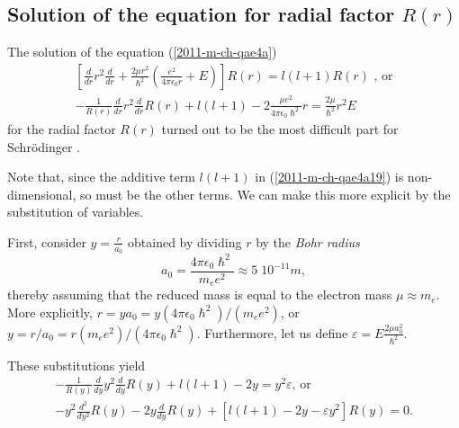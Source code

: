 \subsection{Solution of the equation  for radial factor $R(r)$}


The solution of the equation   (\ref{2011-m-ch-qae4a})
\begin{equation}
\begin{split}
\left[  \frac{   d   }{   d    r}  r^2\frac{   d   }{   d    r}   +
\frac{2\mu r^2}{\hslash^2} \left(\frac{e^2}{4\pi \epsilon_0r} + E \right) \right] R(r)
 =  l(l+1)  R( r ) \textrm{ , or}\\
-\frac{1}{R(r)} \frac{d}{   d    r}  r^2\frac{   d   }{   d    r} R( r ) +    l(l+1)
-
2
\frac{\mu e^2}{4\pi \epsilon_0\hslash^2} r
 = \frac{2\mu  }{ \hslash^2}  r^2 E
\end{split}
\label{2011-m-ch-qae4a19}
\end{equation}
for the radial factor $R(r)$
turned out to be the most difficult part for Schr\"odinger
\cite{Moore-Schroedinger}.

Note that, since the additive term  $ l(l+1) $ in (\ref{2011-m-ch-qae4a19}) is non-dimensional,
so must be the other terms.
We can make this more explicit by the substitution of variables.

First, consider $y =\frac{r}{a_0}$ obtained by dividing $r$ by the
{\em Bohr radius}
\begin{equation}
a_0= \frac{4\pi \epsilon_0 \hslash^2}{m_e e^2}\approx 5\; 10^{-11} m,
\label{2011-m-ch-qaebohrr}
\end{equation}
thereby assuming that the reduced mass is equal to the electron mass $\mu \approx m_e$.
More explicitly,
$r=ya_0= y  (4\pi \epsilon_0 \hslash^2)/(m_e e^2)$,
or $y= r/a_0= r  (m_e e^2)/(4\pi \epsilon_0 \hslash^2)$.
Furthermore, let us define $\varepsilon = E \frac{2\mu a_0^2}{\hslash^2}$.

These substitutions yield
\begin{equation}
\begin{split}
-\frac{1}{R(y)} \frac{d}{   d    y}  y^2\frac{   d   }{   d    y} R( y ) +    l(l+1)
-2 y
 = y^2 \varepsilon \textrm{, or}\\
-y^2 \frac{d^2}{   d    y^2} R( y )  - 2 y \frac{   d   }{   d    y} R( y )
+ \left[   l(l+1) -2 y   -\varepsilon   y^2  \right] R( y )
 = 0.
\end{split}
\label{2011-m-ch-qae4a191}
\end{equation}

